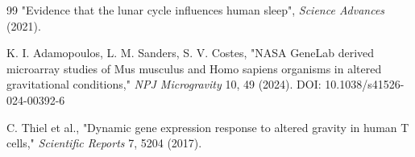 \documentclass[12pt,a4paper]{article}
\theoremstyle{remark}
\begin{document}
\begin{thebibliography}{99}
		"Evidence that the lunar cycle influences human sleep", \emph{Science Advances} (2021).
		
		K. I. Adamopoulos, L. M. Sanders, S. V. Costes, "NASA GeneLab derived microarray studies of Mus musculus and Homo sapiens organisms in altered gravitational conditions," \emph{NPJ Microgravity} 10, 49 (2024). DOI: 10.1038/s41526-024-00392-6
		
		C. Thiel et al., "Dynamic gene expression response to altered gravity in human T cells," \emph{Scientific Reports} 7, 5204 (2017).
		
	\end{thebibliography}
	
\end{document}
